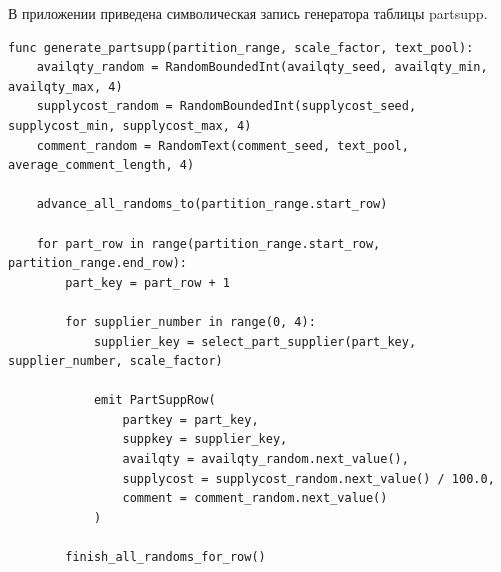 \setcounter{appendixlstbase}{\value{lstlisting}}
\renewcommand{\thelstlisting}{\Asbuk{appendicesnum}.\number\numexpr\value{lstlisting}-\value{appendixlstbase}\relax}
\label{appendix:partsupp}

В приложении приведена символическая запись генератора таблицы
partsupp.

\begin{lstlisting}[style=reportpseudocode,caption={Формирование таблицы partsupp},label={lst:app-partsupp}]
func generate_partsupp(partition_range, scale_factor, text_pool):
    availqty_random = RandomBoundedInt(availqty_seed, availqty_min, availqty_max, 4)
    supplycost_random = RandomBoundedInt(supplycost_seed, supplycost_min, supplycost_max, 4)
    comment_random = RandomText(comment_seed, text_pool, average_comment_length, 4)

    advance_all_randoms_to(partition_range.start_row)

    for part_row in range(partition_range.start_row, partition_range.end_row):
        part_key = part_row + 1

        for supplier_number in range(0, 4):
            supplier_key = select_part_supplier(part_key, supplier_number, scale_factor)

            emit PartSuppRow(
                partkey = part_key,
                suppkey = supplier_key,
                availqty = availqty_random.next_value(),
                supplycost = supplycost_random.next_value() / 100.0,
                comment = comment_random.next_value()
            )

        finish_all_randoms_for_row()
\end{lstlisting}
